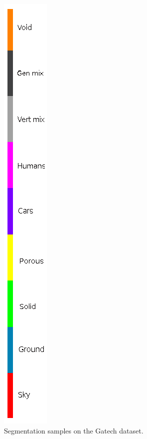 \begin{figure}[t]
\begin{minipage}[c]{.1\textwidth}
        \includegraphics[width=.7\textwidth]{img/deconvLSTM/gatech_barra.png}
    \end{minipage}%
    \caption{Segmentation samples on the Gatech dataset.}
	\label{fig:deconvlstm_gatech_samples}
\end{figure}

